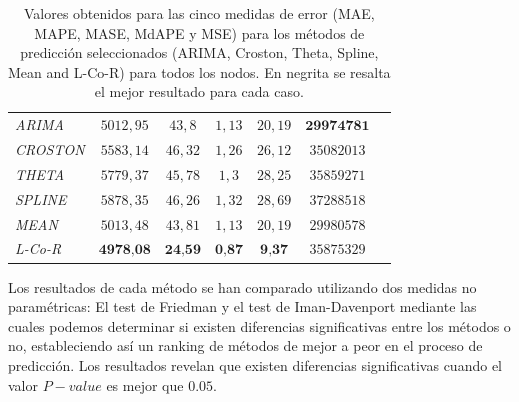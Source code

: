 \documentclass[runningheads]{llncs}
\begin{document}
\begin{table}
\begin{center}
\begin{tabular}{|l|c|c|c|c|c|c|}
\emph{ARIMA } & $5012,95$ & $43,8$ & $1,13$ & $20,19$ & $\textbf{29974781}$ \\%
\emph{CROSTON } & $5583,14$ & $46,32$ & $1,26$ & $26,12$ & $35082013$ \\%
\emph{THETA } & $5779,37$ & $45,78$ & $1,3$ & $28,25$ & $35859271$ \\%
\emph{SPLINE } & $5878,35$ & $46,26$ & $1,32$ & $28,69$ & $37288518$ \\%
\emph{MEAN } & $5013,48$ & $43,81$ & $1,13$ & $20,19$ & $29980578$ \\%
\emph{L-Co-R} & $\textbf{4978,08}$ & $\textbf{24,59}$ & $\textbf{0,87}$ & $\textbf{9,37}$ &
$35875329$ \\%


\hline

 \end{tabular}
 \end{center}
 \caption{Valores obtenidos para las cinco medidas de error (MAE,
MAPE, MASE, MdAPE y MSE) para los métodos de predicción seleccionados (ARIMA, Croston, Theta,
Spline, Mean and L-Co-R) para todos los nodos. En negrita se resalta el mejor resultado para cada
caso.
 \label{tb:ts-results}}
 \end{table}

Los resultados de cada método se han comparado utilizando dos medidas no paramétricas: El test de
Friedman y el test de Iman-Davenport mediante las cuales podemos determinar si existen diferencias
significativas entre los métodos o no, estableciendo así un ranking de métodos de mejor a peor en
el proceso de predicción. Los resultados revelan que existen diferencias significativas cuando el
valor $P-value$ es mejor que $0.05$. 
\end{document}
